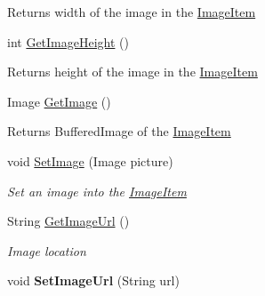 \begin{DoxyCompactItemize}
\begin{DoxyCompactList}
\begin{DoxyReturn}{Returns}
width of the image in the \mbox{\hyperlink{class_space_v_i_l_1_1_image_item}{Image\+Item}} 
\end{DoxyReturn}
\end{DoxyCompactList}\item 
\mbox{\label{class_space_v_i_l_1_1_image_item_aaf6f20ac9beb72233f9fcc46491b7e16}} 
int \mbox{\hyperlink{class_space_v_i_l_1_1_image_item_aaf6f20ac9beb72233f9fcc46491b7e16}{Get\+Image\+Height}} ()
\begin{DoxyCompactList}\small\item\em \begin{DoxyReturn}{Returns}
height of the image in the \mbox{\hyperlink{class_space_v_i_l_1_1_image_item}{Image\+Item}} 
\end{DoxyReturn}
\end{DoxyCompactList}\item 
\mbox{\label{class_space_v_i_l_1_1_image_item_a2bc43b924f977bc39e61bf1461b7fb83}} 
Image \mbox{\hyperlink{class_space_v_i_l_1_1_image_item_a2bc43b924f977bc39e61bf1461b7fb83}{Get\+Image}} ()
\begin{DoxyCompactList}\small\item\em \begin{DoxyReturn}{Returns}
Buffered\+Image of the \mbox{\hyperlink{class_space_v_i_l_1_1_image_item}{Image\+Item}} 
\end{DoxyReturn}
\end{DoxyCompactList}\item 
void \mbox{\hyperlink{class_space_v_i_l_1_1_image_item_ae62563d3131e913b37293731fa535205}{Set\+Image}} (Image picture)
\begin{DoxyCompactList}\small\item\em Set an image into the \mbox{\hyperlink{class_space_v_i_l_1_1_image_item}{Image\+Item}} \end{DoxyCompactList}\item 
String \mbox{\hyperlink{class_space_v_i_l_1_1_image_item_a9da0616d71482cc74d16e83ea00913af}{Get\+Image\+Url}} ()
\begin{DoxyCompactList}\small\item\em Image location \end{DoxyCompactList}\item 
\mbox{\label{class_space_v_i_l_1_1_image_item_ad73bdbad08bb6637dc55363cdddb470e}} 
void {\bfseries Set\+Image\+Url} (String url)
\end{DoxyCompactItemize}
